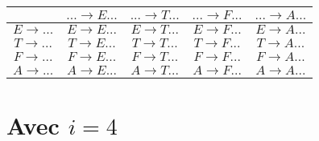 \documentclass[class=article]{standalone}
\begin{document}
\begin{center}
    \begin{tabular}{c|c|c|c|c|}
        \cellcolor[HTML]{FFFFFF}                     & 
        \cellcolor[HTML]{FFFFFF} $... \rightarrow E...$ &
        \cellcolor[HTML]{FFFFFF} $... \rightarrow T...$ & 
        \cellcolor[HTML]{FFFFFF} $... \rightarrow F...$ & 
        \cellcolor[HTML]{FFFFFF} $... \rightarrow A...$ \\
    \hline
        \cellcolor[HTML]{FFFFFF} $E \rightarrow ...$ & 
        \cellcolor[HTML]{FF0000} $E \rightarrow E...$ & 
        \cellcolor[HTML]{ABFF00} $E \rightarrow T...$ & 
        \cellcolor[HTML]{ABFF00} $E \rightarrow F...$ & 
        \cellcolor[HTML]{ABFF00} $E \rightarrow A...$ \\
    \hline
        \cellcolor[HTML]{FFFFFF} $T \rightarrow ...$ & 
        \cellcolor[HTML]{FF0000} $T \rightarrow E...$ & 
        \cellcolor[HTML]{FF0000} $T \rightarrow T...$ & 
        \cellcolor[HTML]{ABFF00} $T \rightarrow F...$ &
        \cellcolor[HTML]{ABFF00} $T \rightarrow A...$ \\
    \hline
        \cellcolor[HTML]{FFFFFF} $F \rightarrow ...$ &
        \cellcolor[HTML]{FF0000} $F \rightarrow E...$ &
        \cellcolor[HTML]{FF0000} $F \rightarrow T...$ & 
        \cellcolor[HTML]{FF0000} $F \rightarrow F...$ & 
        \cellcolor[HTML]{ABFF00} $F \rightarrow A...$ \\
    \hline
        \cellcolor[HTML]{FFFFFF} $A \rightarrow ...$ & 
        \cellcolor[HTML]{FFFFFF} $A \rightarrow E...$ & 
        \cellcolor[HTML]{FFFFFF} $A \rightarrow T...$ & 
        \cellcolor[HTML]{FFFFFF} $A \rightarrow F...$ & 
        \cellcolor[HTML]{FFFFFF} $A \rightarrow A...$ \\
    \hline
    \end{tabular}
\end{center}

\section*{Avec $i = 4$}
\end{document}

